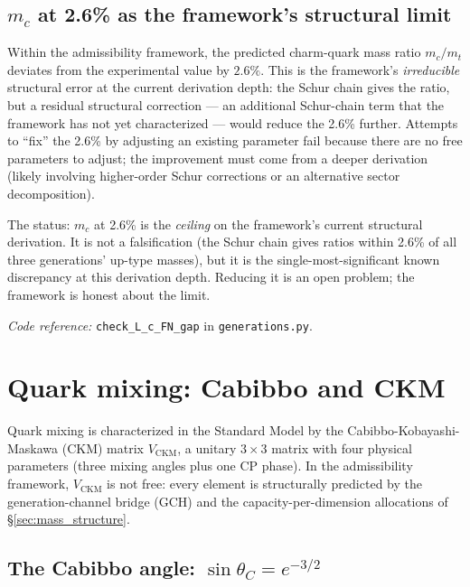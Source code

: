 \documentclass[11pt]{article}
\newcommand{\coderef}[2]{\smallskip\noindent\textit{Code reference:} \texttt{#1} in \texttt{#2}.}
\theoremstyle{definition}
\begin{document}
\subsection{\texorpdfstring{$m_c$}{mc} at 2.6\% as the framework's structural limit}\label{sec:mc_limit}

Within the admissibility framework, the predicted charm-quark mass ratio $m_c / m_t$ deviates from the experimental value by $2.6\%$. This is the framework's \emph{irreducible} structural error at the current derivation depth: the Schur chain gives the ratio, but a residual structural correction --- an additional Schur-chain term that the framework has not yet characterized --- would reduce the 2.6\% further. Attempts to ``fix'' the 2.6\% by adjusting an existing parameter fail because there are no free parameters to adjust; the improvement must come from a deeper derivation (likely involving higher-order Schur corrections or an alternative sector decomposition).

The status: $m_c$ at 2.6\% is the \emph{ceiling} on the framework's current structural derivation. It is not a falsification (the Schur chain gives ratios within 2.6\% of all three generations' up-type masses), but it is the single-most-significant known discrepancy at this derivation depth. Reducing it is an open problem; the framework is honest about the limit.

\coderef{check\_L\_c\_FN\_gap}{generations.py}

\section{Quark mixing: Cabibbo and CKM}\label{sec:ckm}

Quark mixing is characterized in the Standard Model by the Cabibbo-Kobayashi-Maskawa (CKM) matrix $V_{\mathrm{CKM}}$, a unitary $3\times 3$ matrix with four physical parameters (three mixing angles plus one CP phase). In the admissibility framework, $V_{\mathrm{CKM}}$ is not free: every element is structurally predicted by the generation-channel bridge (GCH) and the capacity-per-dimension allocations of \S\ref{sec:mass_structure}.

\subsection{The Cabibbo angle: \texorpdfstring{$\sin\theta_C = e^{-3/2}$}{sin thetaC = e(-3/2)}}\label{sec:cabibbo}
\end{document}
